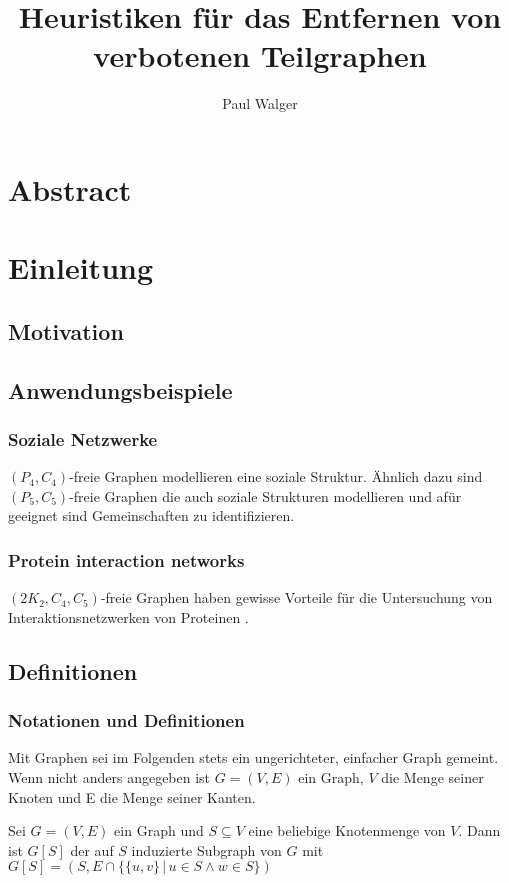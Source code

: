 \documentclass[12pt,a4paper,onecolumn,oneside,titlepage]{article}
\author{Paul Walger}
\title{Heuristiken für das Entfernen von verbotenen Teilgraphen}
\begin{document}
\maketitle
\tableofcontents
\newpage

\section{Abstract}

\section{Einleitung}


\subsection{Motivation}


\subsection{Anwendungsbeispiele}

\subsubsection{Soziale Netzwerke}
 $(P_4,C_4)$-freie Graphen modellieren eine soziale Struktur.\cite{NastosG13}
 Ähnlich dazu sind $(P_5,C_5)$-freie Graphen die auch soziale Strukturen modellieren und afür geeignet sind Gemeinschaften zu identifizieren. \cite{Schoch15}

\subsubsection{Protein interaction networks}
$(2K_2, C_4, C_5)$-freie Graphen haben gewisse Vorteile für die Untersuchung von Interaktionsnetzwerken von Proteinen \cite{BrucknerHK15}.
\subsection{Definitionen}
\subsubsection{Notationen und Definitionen}
Mit Graphen sei im Folgenden stets ein ungerichteter, einfacher Graph gemeint. Wenn nicht anders angegeben ist $G=(V,E)$ ein Graph, $V$ die Menge seiner Knoten und E die Menge seiner Kanten.

Sei $G = (V,E)$ ein Graph und $S \subseteq V$ eine beliebige Knotenmenge von $V$. 
Dann ist $G[S]$ der auf $S$ induzierte Subgraph von $G$ mit $G[S] = (S, E \cap \{\{u,v\} \,|\, u \in S \land w \in S\})$
\end{document}

